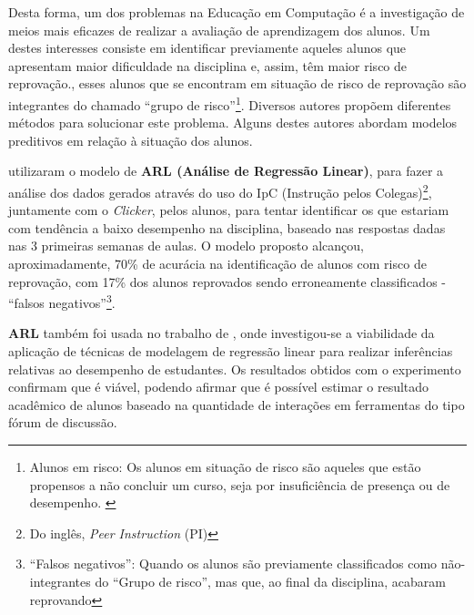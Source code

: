 \documentclass[
	12pt,				%
	openright,			%
	oneside,
	a4paper,			%
	english,			%
	french,				%
	spanish,			%
	brazil,				%
	]{abntex2}
\begin{document}
Desta forma, um dos problemas na Educação em Computação é a investigação de meios mais eficazes de realizar a avaliação de aprendizagem dos alunos. Um destes interesses consiste em identificar previamente aqueles alunos que apresentam maior dificuldade na disciplina e, assim, têm maior risco de reprovação.\cite{martins2012assistente}, esses alunos que se encontram em situação de risco de reprovação são integrantes do chamado ``grupo de risco''\footnote[1]{Alunos em risco: Os alunos em situação de risco são aqueles que estão propensos a não concluir um curso, seja por insuficiência de presença ou de desempenho. \cite{da2014alunos}}. Diversos autores propõem diferentes métodos para solucionar este problema. Alguns destes autores abordam modelos preditivos em relação à situação dos alunos.




 utilizaram o modelo de \textbf{ARL (Análise de Regressão Linear)}, para fazer a análise dos dados gerados através do uso do IpC (Instrução pelos Colegas)\footnote[2]{Do inglês, \textit{Peer Instruction} (PI)}, juntamente com o \textit{Clicker}, pelos alunos, para tentar identificar os que estariam com tendência a baixo desempenho na disciplina, baseado nas respostas dadas nas 3 primeiras semanas de aulas. O modelo proposto alcançou, aproximadamente, 70\% de acurácia na identificação de alunos com risco de reprovação, com 17\% dos alunos reprovados sendo erroneamente classificados - ``falsos negativos''\footnote[3]{``Falsos negativos'': Quando os alunos são previamente classificados como não-integrantes do ``Grupo de risco'', mas que, ao final da disciplina, acabaram reprovando}.

\textbf{ARL} também foi usada no trabalho de , onde investigou-se a viabilidade da aplicação de técnicas de modelagem de regressão linear para realizar inferências relativas ao desempenho de estudantes. Os resultados obtidos com o experimento confirmam que é viável, podendo afirmar que é possível estimar o resultado acadêmico de alunos baseado na quantidade de interações em ferramentas do tipo fórum de discussão. 
\end{document}
